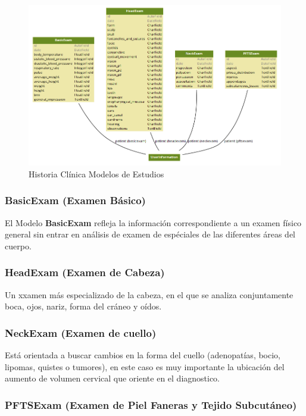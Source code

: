 \begin{figure}[H]
    \centering
    \includegraphics[scale=0.5]{resourse/hc3.png}
    \caption{Historia Clínica Modelos de Estudios}
    \label{fig:hc2}
\end{figure} 


\subsubsection{BasicExam (Examen Básico)}

El Modelo \textbf{BasicExam} refleja la información correspondiente a un examen físico general sin entrar en análisis de examen de espéciales de las diferentes áreas del cuerpo.


\subsubsection{HeadExam (Examen de Cabeza)}

Un xxamen más especializado de la cabeza,  en el que se analiza conjuntamente boca, ojos, nariz, forma del cráneo y oídos.


\subsubsection{NeckExam (Examen de cuello)}
Está orientada a buscar cambios en la forma del cuello (adenopatías, bocio, lipomas, quistes o tumores), en este caso es muy importante la ubicación del aumento de volumen cervical que oriente en el diagnostico.

\subsubsection{PFTSExam (Examen de Piel Faneras y Tejido Subcutáneo)}


